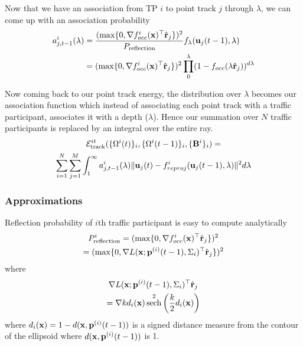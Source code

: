 \documentclass[10pt,twocolumn,letterpaper]{article}
\DeclareMathOperator{\sech}{sech}
\begin{document}
Now that we have an association from TP $i$ to point track $j$ through
$\lambda$, we can come up with an association probability
\newcommand{\occfxi}{L(\mathbf{x}; \pos{i}{t-1}, \Sigma_i)}
\newcommand{\occfi}{L(\lambda \ray; \pos{i}{t-1}, \Sigma_i)}
\newcommand{\assocP}{a^{i}_{j,t-1}(\lambda)}
\begin{align}
   \assocP &= \frac{(\max \{ 0, \nabla \occf^\top
\ray \})^2 }{P_{\text{reflection}}}\lambdadist\\
&=(\max \{ 0, \nabla \occf^\top \ray \})^2
  \prod_{0}^{\lambda} (1 - f_{occ}(\lambda \ray))^{d\lambda}
\end{align}

Now coming back to our point track energy, the distribution over $\lambda$
becomes our association function which instead of associating each point track
with a traffic participant, associates it with a depth ($\lambda$). Hence our
summation over $N$ traffic participants is replaced by an integral over the
entire ray.
\begin{multline}
  \mathcal{E}^{it}_{\text{track}}(\{ \Omega^{i}(t) \}_i, \{ \Omega^{i}(t-1) \}_i,\{ \mathbf{B}^{i} \}_i) = \\
    \sum_{i = 1}^N
    \sum_{j = 1}^{M}
    \int_1^{\infty}
    a^i_{j,t-1}(\lambda) 
    \|\mathbf{u}_j(t) - f^i_{reproj}(\mathbf{u}_j(t-1), \lambda)\|^2
    d\lambda
\end{multline}

\subsubsection{Approximations}
\newcommand{\Ptrans}{P_{\text{transmission}}}
\newcommand{\Prefl}{P^i_{\text{reflection}}}
\newcommand{\dishort}{d_i(\mathbf{x})}

Reflection probability of $i$th traffic participant is easy to compute
analytically 
\begin{multline}
  \Prefl =
  (\max \{ 0, \nabla \occf^\top \ray \})^2 \\
  = (\max \{ 0, \nabla \occfxi^\top\ray \})^2
  \label{eq:analytic-prefl}
\end{multline}
where 
\begin{multline}
  \nabla \occfxi^\top\ray \\=
  \nabla k\dishort \sech^2\left(\frac{k}{2}\dishort\right)
\end{multline}
where $\dishort = 1-d(\mathbf{x}, \pos{i}{t-1})$ is a signed distance measure
from the contour of the ellipsoid where $d(\mathbf{x}, \mathbf{p}^{(i)}(t-1))$ is 1.
\end{document}
